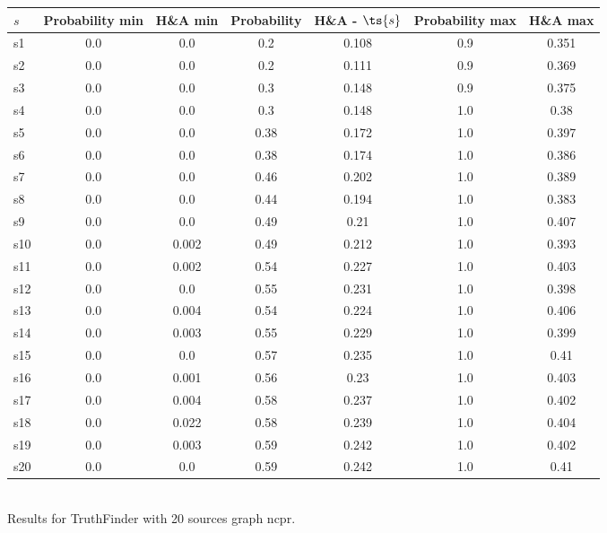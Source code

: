 \documentclass{article}
\begin{document}
\noindent\begin{tabular}{|l|c|c|c|c|c|c|}
\hline
$s$& Probability min & H\&A min & Probability & H\&A - $\ts{s}$ & Probability max & H\&A max\\
\hline
s1 &0.0 & 0.0 & 0.2 & 0.108 & 0.9 & 0.351\\
\hline
s2 &0.0 & 0.0 & 0.2 & 0.111 & 0.9 & 0.369\\
\hline
s3 &0.0 & 0.0 & 0.3 & 0.148 & 0.9 & 0.375\\
\hline
s4 &0.0 & 0.0 & 0.3 & 0.148 & 1.0 & 0.38\\
\hline
s5 &0.0 & 0.0 & 0.38 & 0.172 & 1.0 & 0.397\\
\hline
s6 &0.0 & 0.0 & 0.38 & 0.174 & 1.0 & 0.386\\
\hline
s7 &0.0 & 0.0 & 0.46 & 0.202 & 1.0 & 0.389\\
\hline
s8 &0.0 & 0.0 & 0.44 & 0.194 & 1.0 & 0.383\\
\hline
s9 &0.0 & 0.0 & 0.49 & 0.21 & 1.0 & 0.407\\
\hline
s10 &0.0 & 0.002 & 0.49 & 0.212 & 1.0 & 0.393\\
\hline
s11 &0.0 & 0.002 & 0.54 & 0.227 & 1.0 & 0.403\\
\hline
s12 &0.0 & 0.0 & 0.55 & 0.231 & 1.0 & 0.398\\
\hline
s13 &0.0 & 0.004 & 0.54 & 0.224 & 1.0 & 0.406\\
\hline
s14 &0.0 & 0.003 & 0.55 & 0.229 & 1.0 & 0.399\\
\hline
s15 &0.0 & 0.0 & 0.57 & 0.235 & 1.0 & 0.41\\
\hline
s16 &0.0 & 0.001 & 0.56 & 0.23 & 1.0 & 0.403\\
\hline
s17 &0.0 & 0.004 & 0.58 & 0.237 & 1.0 & 0.402\\
\hline
s18 &0.0 & 0.022 & 0.58 & 0.239 & 1.0 & 0.404\\
\hline
s19 &0.0 & 0.003 & 0.59 & 0.242 & 1.0 & 0.402\\
\hline
s20 &0.0 & 0.0 & 0.59 & 0.242 & 1.0 & 0.41\\
\hline
\end{tabular}\\

\noindent Results for TruthFinder with 20 sources graph ncpr.
\end{document}
